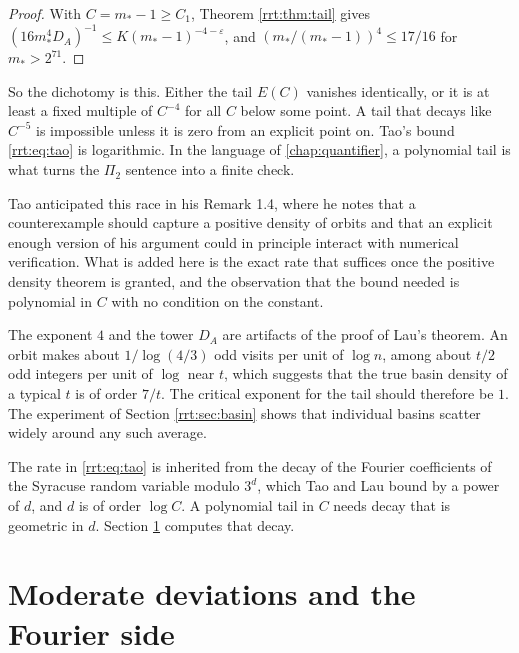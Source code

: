 \begin{proof}
With $C=m_*-1\ge C_1$, Theorem \ref{rrt:thm:tail} gives $(16m_*^4D_A)^{-1}\le K(m_*-1)^{-4-\varepsilon}$, and $(m_*/(m_*-1))^4\le 17/16$ for $m_*>2^{71}$.
\end{proof}

So the dichotomy is this. Either the tail $E(C)$ vanishes identically, or it is at least a fixed multiple of $C^{-4}$ for all $C$ below some point. A tail that decays like $C^{-5}$ is impossible unless it is zero from an explicit point on. Tao's bound \eqref{rrt:eq:tao} is logarithmic. In the language of \cref{chap:quantifier}, a polynomial tail is what turns the $\Pi_2$ sentence into a finite check.

\begin{remark}
Tao anticipated this race in his Remark 1.4, where he notes that a counterexample should capture a positive density of orbits and that an explicit enough version of his argument could in principle interact with numerical verification. What is added here is the exact rate that suffices once the positive density theorem is granted, and the observation that the bound needed is polynomial in $C$ with no condition on the constant.
\end{remark}

\begin{remark}
The exponent $4$ and the tower $D_A$ are artifacts of the proof of Lau's theorem. An orbit makes about $1/\log(4/3)$ odd visits per unit of $\log n$, among about $t/2$ odd integers per unit of $\log$ near $t$, which suggests that the true basin density of a typical $t$ is of order $7/t$. The critical exponent for the tail should therefore be $1$. The experiment of Section \ref{rrt:sec:basin} shows that individual basins scatter widely around any such average.
\end{remark}

\begin{remark}
The rate in \eqref{rrt:eq:tao} is inherited from the decay of the Fourier coefficients of the Syracuse random variable modulo $3^d$, which Tao and Lau bound by a power of $d$, and $d$ is of order $\log C$. A polynomial tail in $C$ needs decay that is geometric in $d$. Section \ref{rrt:sec:fourier} computes that decay.
\end{remark}


\section{Moderate deviations and the Fourier side}\label{rrt:sec:fourier}

